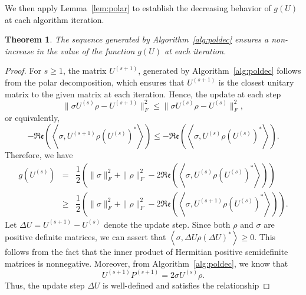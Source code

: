 \documentclass[sn-mathphys-num]{sn-jnl}%
\newcommand{\rinner}[1]{\mathfrak{Re}\left(\left<#1\right>\right)}
\newcommand{\inner}[1]{\left<#1\right>}
\theoremstyle{thmstyleone}%
\newtheorem{theorem}{Theorem}%
\theoremstyle{thmstyletwo}%
\theoremstyle{thmstylethree}%
\begin{document}
We then apply Lemma~\ref{lem:polar} to establish the decreasing behavior of $g(U)$ at each algorithm iteration.
\begin{theorem}\label{thm:decreasing}
The sequence generated by Algorithm~\ref{alg:poldec} ensures a non-increase in the value of the function $g(U)$ at each iteration. 
\end{theorem}
%
%
%
\begin{proof}
%
For $s\geq 1$, the matrix $U^{(s+1)}$, generated by Algorithm~\ref{alg:poldec} follows from the polar decomposition, which ensures that $U^{(s+1)}$ is the closest unitary matrix to the given matrix at each iteration. Hence, the update at each step
    \begin{equation*}
    \|\sigma U^{(s)}\rho - U^{(s+1)}\|_F^2 \leq  \|\sigma U^{(s)}\rho - U^{(s)}\|_F^2,
    \end{equation*}
or equivalently, 
\begin{equation*}
-\rinner{\sigma, U^{(s+1)}\rho \left(U^{(s)}\right)^*}
\leq 
-\rinner{\sigma, U^{(s)}\rho \left(U^{(s)}\right)^*}.
\end{equation*}
Therefore, we have
    \begin{eqnarray*}
        g(U^{(s)}) &=& 
        \dfrac{1}{2} \left(\|\sigma\|_F^2+\|\rho\|_F^2-2\rinner{\sigma, U^{(s)}\rho \left(U^{(s)}\right)^*}\right)\\
        &\geq&\dfrac{1}{2} \left(\|\sigma\|_F^2+\|\rho\|_F^2-2\rinner{\sigma, U^{(s+1)}\rho \left(U^{(s)}\right)^*}\right).
    \end{eqnarray*}
Let $\Delta U = U^{(s+1)}-U^{(s)}$ denote the update step. 
Since both $\rho$ and $\sigma$ are positive definite matrices, we can assert that $\inner{\sigma, \Delta U\rho \left(\Delta U\right)^*} \geq 0$. This follows from the fact that the inner product of Hermitian positive semidefinite matrices is nonnegative. Moreover,  from Algorithm~\ref{alg:poldec}, we know that  \[U^{(s+1)}P^{(s+1)} = 2\sigma U^{(s)}\rho.\] Thus, the update step $\Delta U$ is well-defined and satisfies the relationship

\end{proof}
\end{document}
